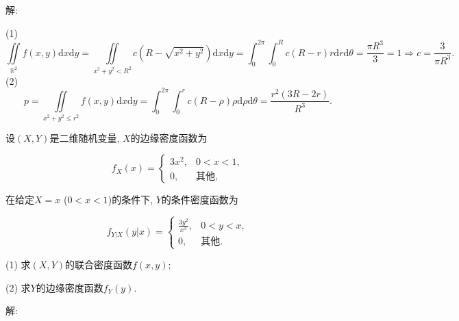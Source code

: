 \documentclass[standard]{ExBook}
\begin{document}
\begin{qitems}
\vspace{-5em}

    \begin{bbox}
解: 

(1)
$$\displaystyle\iint\limits_{\mathbb{R}^2}f(x,y)\mathrm{d}x\mathrm{d}y=\iint\limits_{x^2+y^2<R^2}c(R-\sqrt{x^2+y^2})\mathrm{d}x\mathrm{d}y=\int_{0}^{2\pi}\int_{0}^{R}c(R-r)r\mathrm{d}r\mathrm{d}\theta=\frac{\pi R^3}{3}=1 \Longrightarrow c=\frac{3}{\pi R^3}.$$
(2)
$$p=\displaystyle\iint\limits_{x^2+y^2\leq r^2}f(x,y)\mathrm{d}x\mathrm{d}y=\int_{0}^{2\pi}\int_{0}^{r}c(R-\rho)\rho\mathrm{d}\rho\mathrm{d}\theta=\frac{r^2(3R-2r)}{R^3}.$$
    \end{bbox}

\vspace{-5em}

    \begin{bbox}
    \begin{shaded}
        \qitem
设$(X,Y)$是二维随机变量, $X$的边缘密度函数为
\vspace{-2em}
\begin{center}
\begin{equation}
    f_{X}(x)=
    \left\{
    \begin{array}{cl}
        \nonumber
        3x^2, & 0 < x < 1,\\
        0, & \text{其他},
    \end{array}
    \right.
\end{equation}
\end{center}
在给定$X=x$ ($0 < x < 1$)的条件下, $Y$的条件密度函数为
\vspace{-2em}
\begin{center}
\begin{equation}
    f_{Y|X}(y|x)=
    \left\{
    \begin{array}{cl}
        \nonumber
        \displaystyle\frac{3y^2}{x^3}, & 0 < y < x,\\
        0, & \text{其他}.
    \end{array}
    \right.
\end{equation}
\end{center}
(1) 求$(X,Y)$的联合密度函数$f(x,y)$;

(2) 求$Y$的边缘密度函数$f_{Y}(y)$.
    \end{shaded}
    \end{bbox}

\vspace{-5em}

    \begin{bbox}
解: 


\end{bbox}
\end{qitems}
\end{document}
